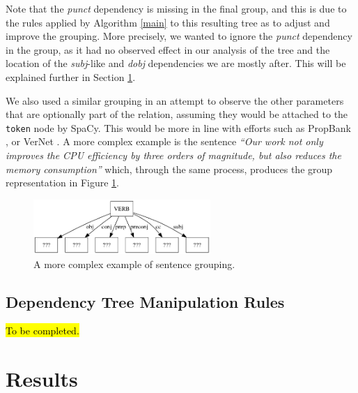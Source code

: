 \documentclass[11pt,a4paper,openright]{memoir}
\begin{document}
Note that the \emph{punct} dependency is missing in the final group, and this is due to the rules applied by Algorithm \ref{main} to this resulting tree as to adjust and improve the grouping. More precisely, we wanted to ignore the \emph{punct} dependency in the group, as it had no observed effect in our analysis of the tree and the location of the \emph{subj}-like and \emph{dobj} dependencies we are mostly after. This will be explained further in Section \ref{section:rules}. 

We also used a similar grouping in an attempt to observe the other parameters that are optionally part of the relation, assuming they would be attached to the \texttt{token} node by SpaCy. This would be more in line with efforts such as PropBank \cite{Palmer:2005:PBA:1122624.1122628}, or VerNet \cite{Schuler:2005:VBC:1104493}. A more complex example is the sentence \emph{\enquote{Our work not only improves the CPU efficiency by three orders of magnitude, but also reduces the memory consumption}} which, through the same process, produces the group representation in Figure \ref{fig:group_output_3}.

\begin{figure}[!htbp]
  \centering
    \includegraphics[width=0.6\textwidth]{./images/command-simplified-group-improves-29}
  \caption[A more complex example of sentence grouping.]{A more complex example of sentence grouping.}
  \label{fig:group_output_3}
\end{figure}



%
%
%
%

\section{Dependency Tree Manipulation Rules}
\label{section:rules}

\hl{To be completed.}



%
%
%
%

\chapter{Results}
\end{document}
